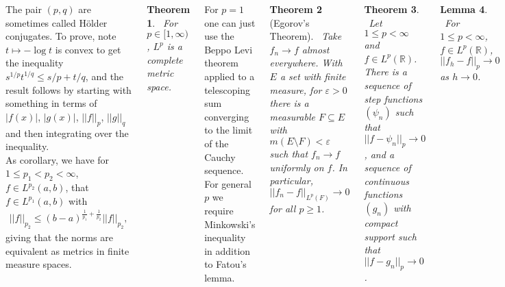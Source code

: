 \documentclass{tikzposter} %
\newtheorem{theorem}{Theorem}
\newtheorem{lemma}[theorem]{Lemma}
\begin{document}
\begin{columns}
{        The pair $(p,q)$ are sometimes called H\"{o}lder conjugates. To prove, note $t \mapsto - \log t$ is convex to get the inequality $s^{1/p}t^{1/q} \le s/p + t/q$, and the result follows by starting with something in terms of $|f(x)|$, $|g(x)|$, $||f||_{p}$, $||g||_{q}$ and then integrating over the inequality. \\

        As corollary, we have for $1 \le p_{1} < p_{2} < \infty$, $f \in L^{p_{2}}(a,b)$, that $f \in L^{p_{1}}(a,b)$ with
        \begin{align*}
          ||f||_{p_{2}} \le (b-a)^{\frac{1}{p_{1}} + \frac{1}{p_{2}}} ||f||_{p_{2}},
        \end{align*}
        giving that the norms are equivalent as metrics in finite measure spaces. \\

        \begin{theorem}
        \ For $p \in [1,\infty)$, $L^{p}$ is a complete metric space.
        \end{theorem}
        \hphantom{}

        For $p = 1$ one can just use the Beppo Levi theorem applied to a telescoping sum converging to the limit of the Cauchy sequence. For general $p$ we require Minkowski's inequality in addition to Fatou's lemma. \\

        \begin{theorem}[Egorov's Theorem]
        \ Take $f_{n} \to f$ almost everywhere. With $E$ a set with finite measure, for $\varepsilon > 0$ there is a measurable $F \subseteq E$ with $m(E \setminus F) < \varepsilon$ such that $f_{n} \to f$ uniformly on $f$. In particular, $||f_{n} - f||_{L^{p}(F)} \to 0$ for all $p \ge 1$.
        \end{theorem}
        \hphantom{}

        \begin{theorem}
        \ Let $1 \le p < \infty$ and $f \in L^{p}(\mathbb{R})$. There is a sequence of step functions $(\psi_{n})$ such that $||f - \psi_{n}||_{p} \to 0$, and a sequence of continuous functions $(g_{n})$ with compact support such that $||f-g_{n}||_{p} \to 0$.
        \end{theorem}
        \hphantom{}

        \begin{lemma}
        \ For $1 \le p < \infty$, $f \in L^{p}(\mathbb{R})$, $||f_{h} - f||_{p} \to 0$ as $h \to 0$.
        \end{lemma}
        \hphantom{}

}
\end{columns}
\end{document}
